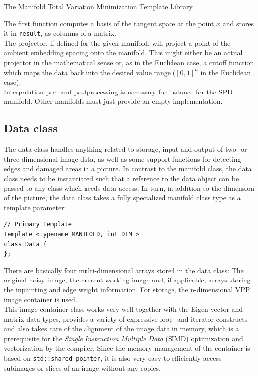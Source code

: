 \begin{chapter}{The Manifold Total Variation Minimization Template Library}
\begin{description}
	The first function computes a basis of the tangent space at the point $x$ and stores it in \texttt{result}, as columns of a matrix.\\
	The projector, if defined for the given manifold, will project a point of the ambient embedding spacing onto the manifold. This might either be an actual projector in the mathematical sense or, as in the Euclidean case, a cutoff
	function which maps the data back into the desired value range ($[0,1]^n$ in the Euclidean case). \\
	Interpolation pre- and postprocessing is necessary for instance for the SPD manifold. Other manifolds must just provide an empty implementation.
\end{description}
\subsection{Data class} %
\label{sub:Data class}
The data class handles anything related to storage, input and output of two- or three-dimensional image data, as well as some support functions for detecting edges and damaged areas in a picture.
In contrast to the manifold class, the data class needs to be instantiated such that a reference to the data object can be passed to any class which needs data access. In turn, in addition
to the dimension of the picture, the data class takes a fully specialized manifold class type as a template parameter:

\cppinline
\begin{lstlisting}
// Primary Template
template <typename MANIFOLD, int DIM >
class Data {
};    
\end{lstlisting}

There are basically four multi-dimensional arrays stored in the data class: The original noisy image, the current working image and, if applicable, arrays storing the inpainting
and edge weight information. For storage, the n-dimensional VPP \cite{VPP} image container is used.\\

This image container class works very well together with the Eigen vector and matrix data types, provides a variety of expressive loop- and iterator constructs and also takes care
of the alignment of the image data in memory, which is a prerequisite for the \textit{Single Instruction Multiple Data} (SIMD) optimization and vectorization by the compiler.
Since the memory management of the container is based on \texttt{std::shared\_pointer}, it is also very easy to efficiently access subimages or slices of an image without any copies.\\


\end{chapter}

